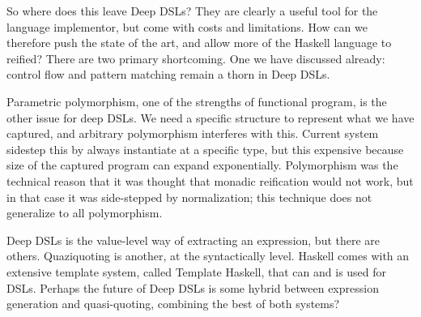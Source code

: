 \documentclass[11pt]{article}
\begin{document}
So where does this leave Deep DSLs? They are clearly a useful tool for the
language implementor, but come with costs and limitations. How can we therefore
push the state of the art, and allow more of the Haskell language to reified?
There are two primary shortcoming.
One we have discussed already: control flow and pattern matching remain a thorn in Deep DSLs. 

Parametric polymorphism, one of the strengths of functional program, is the other
issue for deep DSLs. We need a specific structure to represent what we have captured,
and arbitrary polymorphism interferes with this. Current system sidestep this
by always instantiate at a specific type, but this expensive because size of
the captured program can expand exponentially.
Polymorphism was the technical reason that it was thought that monadic reification
would not work, but in that case it was side-stepped by normalization; this technique
does not generalize to all polymorphism.

Deep DSLs is the value-level way of extracting an expression, but there are others.
Quaziquoting is another, at the syntactically level. Haskell comes with an extensive
template system, called Template Haskell, that can and is used for DSLs.
Perhaps the future of Deep DSLs is some hybrid between expression generation
and quasi-quoting, combining the best of both systems?

{}

\end{document}
